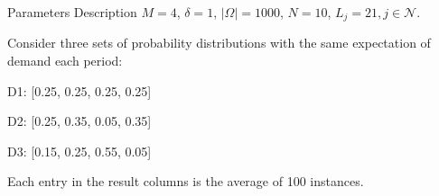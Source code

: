     \begin{frame}{Parameters Description}
      $M =4$, $\delta =1$, $|\Omega| = 1000$, $N =10$, $L_j =21, j \in \mathcal{N}$.
      
      \vspace{0.2cm}
      
      Consider three sets of probability distributions with the same expectation of demand each period:

      \vspace{0.2cm}

      \qquad D1: [0.25, 0.25, 0.25, 0.25]

      \vspace{0.2cm}

      \qquad D2: [0.25, 0.35, 0.05, 0.35]
      \vspace{0.2cm}

      \qquad D3: [0.15, 0.25, 0.55, 0.05]

      \vspace{0.2cm}

      Each entry in the result columns is the average of 100 instances.
    \end{frame}

